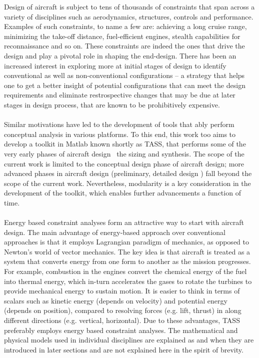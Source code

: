 \documentclass[pdftex,11pt,letter]{article}
\begin{document}
Design of aircraft is subject to tens of thousands of constraints that span across a variety of disciplines such as aerodynamics, structures, controls and performance\cite{NicolaiText,FieldingText,HoweText,RaymerText}. Examples of such constraints, to name a few are: achieving a long cruise range, minimizing the take-off distance, fuel-efficient engines, stealth capabilities for reconnaissance and so on. These constraints are indeed the ones that drive the design and play a pivotal role in shaping the end-design. There has been an increased interest in exploring more at initial stages of design to identify conventional as well as non-conventional configurations -- a strategy that helps one to get a better insight of potential configurations that can meet the design requirements and eliminate restrospective changes that may be due at later stages in design process, that are known to be prohibitively expensive. 
\\\\
Similar motivations have led to the development of tools that ably perform conceptual analysis in various platforms\cite{Raymer2004, Kroo2005}. To this end, this work too aims to develop a toolkit in Matlab\cite{MATLAB} known shortly as TASS, that performs some of the very early phases of aircraft design \ie~the sizing and synthesis. The scope of the current work is limited to the conceptual design phase of aircraft design; more advanced phases in aircraft design (preliminary, detailed design \etc) fall beyond the scope of the current work. Nevertheless, modularity is a key consideration in the development of the toolkit, which enables further advancements a function of time.
\\\\
Energy based constraint analyses form an attractive way to start with aircraft design. The main advantage of energy-based approach over conventional approaches is that it employs Lagrangian paradigm of mechanics, as opposed to Newton's world of vector mechanics. The key idea is that aircraft is treated as a system that converts energy from one form to another as the mission progresses. For example, combustion in the engines convert the chemical energy of the fuel into thermal energy, which in-turn accelerates the gases to rotate the turbines to provide mechanical energy to sustain motion. It is easier to think in terms of scalars such as kinetic energy (depends on velocity) and potential energy (depends on position), compared to resolving forces (e.g. lift, thrust) in along different directions (e.g. vertical, horizontal). Due to these advantages, \textsc{TASS} preferably employs energy based constraint analyses. The mathematical and physical models used in individual disciplines are explained as and when they are introduced in later sections and are not explained here in the spirit of brevity.
\end{document}
